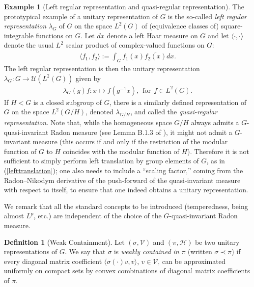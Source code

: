 \documentclass[psamsfonts]{amsart}
\theoremstyle{definition}
\newtheorem{defn}[thm]{Definition}
\newtheorem{exmp}[thm]{Example}
\theoremstyle{remark}
\numberwithin{equation}{section}
\begin{document}
\begin{exmp} [Left regular representation and quasi-regular representation]
The prototypical example of a unitary representation of $G$ is the so-called \emph{left regular representation} $\lambda_{G}$ of $G$ on the space $L^2(G)$ of (equivalence classes of) square-integrable functions on $G$. Let $dx$ denote a left Haar measure on $G$ and let $\langle \cdot, \cdot \rangle$ denote the usual $L^2$ scalar product of complex-valued functions on $G$:
\begin{align*}
\langle f_{1}, f_{2} \rangle := \int_{G} f_{1}(x) \overline{f_{2}(x)} dx.
\end{align*} The left regular representation is then the unitary representation $\lambda_{G} : G \rightarrow \mathcal{U}(L^2(G))$ given by
\begin{align}
\label{lefttranslation}
\lambda_{G}(g)f : x \mapsto f(g^{-1}x), \ \ \mathrm{for} \ \ f \in L^2(G).
\end{align} If $H < G$ is a closed subgroup of $G$, there is a similarly defined representation of $G$ on the space $L^2(G/H)$, denoted $\lambda_{G/H}$, and called the \emph{quasi-regular representation}. Note that, while the homogeneous space $G/H$ always admits a $G$-quasi-invariant Radon measure (see Lemma B.1.3 of \cite{BdV}), it might not admit a $G$-invariant measure (this occurs if and only if the restriction of the modular function of $G$ to $H$ coincides with the modular function of $H$). Therefore it is not sufficient to simply perform left translation by group elements of $G$, as in (\ref{lefttranslation}); one also needs to include a ``scaling factor,'' coming from the Radon--Nikodym derivative of the push-forward of the quasi-invariant measure with respect to itself, to ensure that one indeed obtains a unitary representation.


We remark that all the standard concepts to be introduced (temperedness, being almost $L^p$, etc.) are independent of the choice of the $G$-quasi-invariant Radon measure.
\end{exmp}
\begin{defn} [Weak Containment]
Let $(\sigma, \mathcal{V})$ and $(\pi, \mathcal{H})$ be two unitary representations of $G$. We say that $\sigma$ is \emph{weakly contained in} $\pi$ (written $\sigma \prec \pi$) if every diagonal matrix coefficient $\langle \sigma(\cdot) v, v \rangle$, $v \in \mathcal{V}$, can be approximated uniformly on compact sets by convex combinations of diagonal matrix coefficients of $\pi$.
\end{defn}
\end{document}
